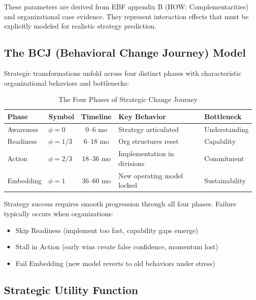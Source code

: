 These parameters are derived from EBF appendix B (HOW: Complementarities) and organizational case evidence. They represent interaction effects that must be explicitly modeled for realistic strategy prediction.

\subsection{The BCJ (Behavioral Change Journey) Model}
\label{subsec:sdm-bcj}

Strategic transformations unfold across four distinct phases with characteristic organizational behaviors and bottlenecks:

\begin{table}[htbp]
\centering
\caption{The Four Phases of Strategic Change Journey}
\label{tab:sdm-phases}
\renewcommand{\arraystretch}{1.4}
\begin{tabular}{@{}llcll@{}}
\toprule
\textbf{Phase} & \textbf{Symbol} & \textbf{Timeline} & \textbf{Key Behavior} & \textbf{Bottleneck} \\
\midrule
Awareness & $\phi=0$ & 0--6 mo & Strategy articulated & Understanding \\
Readiness & $\phi=1/3$ & 6--18 mo & Org structures reset & Capability \\
Action & $\phi=2/3$ & 18--36 mo & Implementation in divisions & Commitment \\
Embedding & $\phi=1$ & 36--60 mo & New operating model locked & Sustainability \\
\bottomrule
\end{tabular}
\end{table}

Strategy success requires smooth progression through all four phases. Failure typically occurs when organizations:
\begin{itemize}
    \item Skip Readiness (implement too fast, capability gaps emerge)
    \item Stall in Action (early wins create false confidence, momentum lost)
    \item Fail Embedding (new model reverts to old behaviors under stress)
\end{itemize}

\subsection{Strategic Utility Function}
\label{subsec:sdm-utility}

